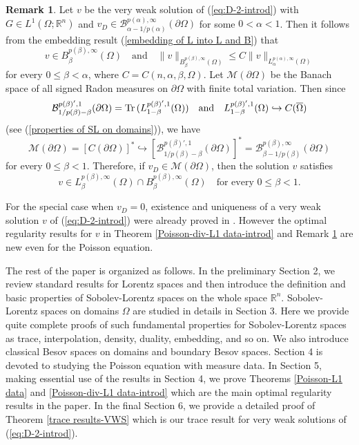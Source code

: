 \documentclass[reqno,centertags,11pt]{amsart}
\theoremstyle{definition}
\newtheorem{rmk}[thm]{Remark}
\numberwithin{thm}{section}
\numberwithin{equation}{section}
\newcommand{\R}{{\mathbb{R}}}
\begin{document}
\begin{rmk}\label{rmk-main2}
Let $v$  be the very weak solution of  (\ref{eq:D-2-introd}) with $ G \in L^1  (\Omega ;\R^n )$  and $v_D \in \mathcal{B}_{\alpha  - 1/p(\alpha)}^{p(\alpha ),\infty}(\partial\Omega )$ for some $0 <\alpha < 1$. Then it follows from the embedding result (\ref{embedding of L into L and B})     that
\[
v \in   B_{\beta}^{p(\beta) ,\infty}(\Omega )
\quad\mbox{and}\quad
 \|   v \|_{ B_{\beta}^{p(\beta) ,\infty}(\Omega )} \le C \|   v \|_{ L_{\alpha}^{p(\alpha) ,\infty}(\Omega )}
\]
for every $0 \le \beta < \alpha$, where  $C=C(n,\alpha , \beta,   \Omega )$.
Let $\mathcal{M}  (\partial \Omega )$ be the Banach space of all signed  Radon measures   on $\partial \Omega$ with finite total variation.
Then since
$$
\mathcal{B}_{1/p(\beta )-\beta}^{p(\beta) ',1}(\partial\Omega ) = {\rm Tr}\, (L_{1-\beta}^{p(\beta )',1}(\Omega )  ) \quad\mbox{and}\quad L_{1-\beta}^{p(\beta )',1}(\Omega )  \hookrightarrow C(\overline{\Omega})
$$
 (see (\ref{properties of SL on domains})), we have
$$
\mathcal{M}(\partial\Omega ) = \left[ C(\partial \Omega )\right]^*  \hookrightarrow \left[\mathcal{B}_{1/p(\beta )-\beta}^{p(\beta) ',1}(\partial\Omega ) \right]^* =  \mathcal{B}_{\beta -1/p(\beta )}^{p(\beta ),\infty}(\partial\Omega )
$$
for every $0 \le \beta < 1$. Therefore, if  $v_D \in \mathcal{M}(\partial\Omega)$, then the solution $v$ satisfies
\[
v \in L_{\beta}^{p(\beta) ,\infty}(\Omega ) \cap B_{\beta}^{p(\beta) ,\infty}(\Omega )
\quad\mbox{for every}\,\, 0 \le \beta < 1.
\]
\end{rmk}


For the special case when $v_D =0$,  existence and uniqueness of a very weak solution  $v  $  of  (\ref{eq:D-2-introd}) were already proved    in \cite[Corollary 1.2]{KO}. However  the optimal regularity results for  $v$  in Theorem   \ref{Poisson-div-L1 data-introd} and Remark \ref{rmk-main2} are   new  even for   the Poisson equation.


\medskip
The rest of the paper is organized as follows. In the preliminary Section 2, we review standard results for Lorentz spaces and then introduce the definition and basic properties of Sobolev-Lorentz spaces on the whole space $\R^n$. Sobolev-Lorentz spaces on domains $\Omega$ are studied in details in Section 3. Here we provide quite complete proofs of such fundamental properties for Sobolev-Lorentz spaces  as   trace, interpolation, density, duality, embedding, and so on. We also introduce classical Besov spaces on domains and boundary Besov spaces. Section 4 is devoted to studying the Poisson equation  with measure data. In Section 5, making essential use of the results in Section 4, we prove  Theorems \ref{Poisson-L1 data} and \ref{Poisson-div-L1 data-introd} which are the    main optimal regularity results in the paper. In the final Section 6, we provide a detailed proof of   Theorem \ref{trace results-VWS} which is our   trace result for very weak solutions of (\ref{eq:D-2-introd}).
\end{document}
